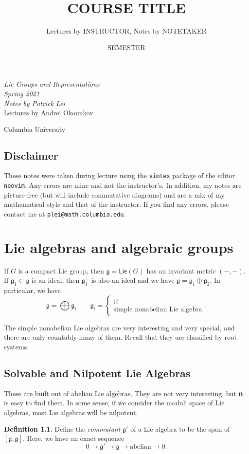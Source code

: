 \documentclass[leqno, openany]{memoir}
\title{COURSE TITLE}
\author{Lectures by INSTRUCTOR, Notes by NOTETAKER}
\date{SEMESTER}
\theoremstyle{definition}
\newtheorem{defn}[thm]{Definition}
\theoremstyle{remark}
\theoremstyle{plain}
\theoremstyle{definition}
\theoremstyle{remark}
\newcommand{\R}{\mathbb{R}}
\newcommand{\mf}[1]{\mathfrak{#1}}
\newcommand{\ms}[1]{\mathsf{#1}}
\newcommand*{\titleSW}
    {\begingroup%
    \raggedleft
    \vspace*{\baselineskip}
    {\Huge\itshape Lie Groups and Representations \\ Spring 2021}\\[\baselineskip]
    {\large\itshape Notes by Patrick Lei}\\[0.2\textheight]
    {\Large Lectures by Andrei Okounkov}\par
    \vfill
    {\Large \sffamily Columbia University}
    \vspace*{\baselineskip}
\endgroup}
\begin{document}
    
\begin{titlingpage}
\titleSW
\end{titlingpage}

\thispagestyle{empty}
\section*{Disclaimer}%
\label{sec:disclaimer}

These notes were taken during lecture using the \texttt{vimtex} package of the
editor \texttt{neovim}.  Any errors are mine and not the instructor's.  In
addition, my notes are picture-free (but will include commutative diagrams) and
are a mix of my mathematical style and that of the instructor.  If you find any
errors, please contact me at \texttt{plei@math.columbia.edu}.  \newpage

\tableofcontents

\chapter{Lie algebras and algebraic groups}%
\label{cha:semisimple_lie_algebras}

If $G$ is a compact Lie group, then $\mf{g} = \ms{Lie}(G)$ has an invariant
metric $(-,-)$. If $\mf{g}_1 \subset \mf{g}$ is an ideal, then
$\mf{g}_1^{\perp}$ is also an ideal and we have $\mf{g} = \mf{g}_1 \oplus
\mf{g}_2$. In particular, we have \[ \mf{g} = \bigoplus \mf{g}_i \qquad
    \mf{g}_i = \begin{cases} \R \\ \text{simple nonabelian Lie algebra}
    \end{cases}. \]

The simple nonabelian Lie algebras are very interesting and very special, and
there are only countably many of them. Recall that they are classified by root
systems. 

\section{Solvable and Nilpotent Lie Algebras}%
\label{sec:solvable_and_nilpotent_lie_algebras}

These are built out of abelian Lie algebras. They are not very interesting, but
it is easy to find them. In some sense, if we consider the moduli space of Lie
algebras, most Lie algebras will be nilpotent.

\begin{defn} Define the \textit{commutant} $\mf{g}'$ of a Lie algebra to be the
    span of $[\mf{g}, \mf{g}]$. Here, we have an exact sequence \[ 0 \to
    \mf{g}' \to \mf{g} \to \text{abelian} \to 0. \] \end{defn}
\end{document}
